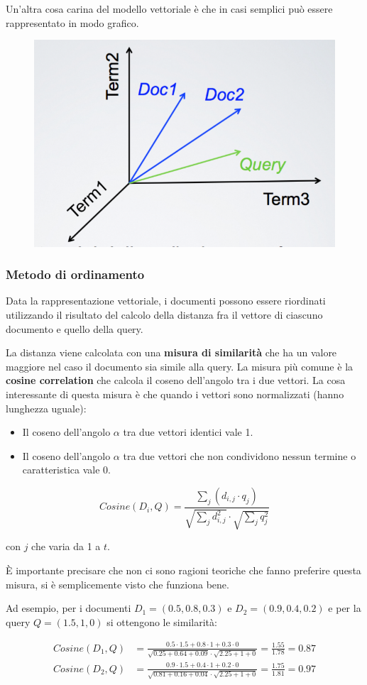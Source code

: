 \noindent Un'altra cosa carina del modello vettoriale è che in casi semplici può essere rappresentato in modo grafico.

\begin{figure}[htbp]
	\centering
	\includegraphics[width=0.3\linewidth]{images/l8-vet}
\end{figure}

\subsubsection{Metodo di ordinamento}

Data la rappresentazione vettoriale, i documenti possono essere riordinati utilizzando il risultato del calcolo della distanza fra il vettore di ciascuno documento e quello della query.

La distanza viene calcolata con una \textbf{misura di similarità} che ha un valore maggiore nel caso il documento sia simile alla query.
La misura più comune è la \textbf{cosine correlation} che calcola il coseno dell'angolo tra i due vettori.
La cosa interessante di questa misura è che quando i vettori sono normalizzati (hanno lunghezza uguale):

\begin{itemize}
	\item Il coseno dell'angolo $\alpha$ tra due vettori identici vale 1.
	\item Il coseno dell'angolo $\alpha$ tra due vettori che non condividono nessun termine o caratteristica vale 0.
\end{itemize} 

$$
Cosine(D_i, Q) = \frac{\sum\limits_j (d_{i,j} \cdot q_j)}{\sqrt{\sum\limits_j d_{i,j}^2} \cdot \sqrt{\sum\limits_j q_{j}^2}}
$$

\noindent con $j$ che varia da 1 a $t$.

\`E importante precisare che non ci sono ragioni teoriche che fanno preferire questa misura, si è semplicemente visto che funziona bene.

Ad esempio, per i documenti $D_1 = (0.5, 0.8, 0.3)$ e $D_2 = (0.9, 0.4, 0.2)$ e per la query $Q = (1.5, 1, 0)$ si ottengono le similarità:

\begin{align*}
	Cosine(D_1,Q) &= \frac{0.5 \cdot 1.5 + 0.8 \cdot 1 + 0.3 \cdot 0}{\sqrt{0.25+0.64+0.09}\cdot \sqrt{2.25+1+0}} = \frac{1.55}{1.78} = 0.87 \\
	Cosine(D_2, Q) &= \frac{0.9\cdot 1.5 + 0.4 \cdot 1 + 0.2 \cdot 0}{\sqrt{0.81 + 0.16 + 0.04}\cdot \sqrt{2.25 + 1 +0}} = \frac{1.75}{1.81} = 0.97
\end{align*}

